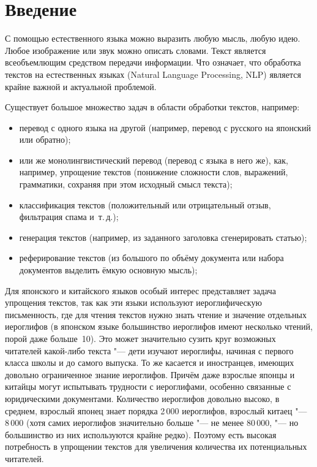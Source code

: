 \chapter*{Введение} %

С помощью естественного языка можно выразить любую мысль, любую идею.
Любое изображение или звук можно описать словами.
Текст является всеобъемлющим средством передачи информации.
Что означает, что обработка текстов на естественных языках (Natural Language Processing, NLP) является крайне важной и актуальной проблемой.

Существует большое множество задач в области обработки текстов, например:
\begin{itemize}%
  \item перевод с одного языка на другой (например, перевод с русского на японский или обратно);
  \item или же монолингвистический перевод (перевод с языка в него же),  как, например, упрощение текстов (понижение сложности слов, выражений, грамматики, сохраняя при этом исходный смысл текста);
  \item классификация текстов (положительный или отрицательный отзыв, фильтрация спама и~т.\,д.);
  \item генерация текстов (например, из заданного заголовка сгенерировать статью);
  \item реферирование текстов (из большого по объёму документа или набора документов выделить ёмкую основную мысль);
\end{itemize}

Для японского и китайского языков особый интерес представляет задача упрощения текстов, так как эти языки используют иероглифическую письменность, где для чтения текстов нужно знать чтение и значение отдельных иероглифов (в японском языке большинство иероглифов имеют несколько чтений, порой даже больше~10).
Это может значительно сузить круг возможных читателей какой-либо текста "--- дети изучают иероглифы, начиная с первого класса школы и до самого выпуска.
То же касается и иностранцев, имеющих довольно ограниченное знание иероглифов.
Причём даже взрослые японцы и китайцы могут испытывать трудности с иероглифами, особенно связанные с юридическими документами.
Количество иероглифов довольно высоко, в среднем, взрослый японец знает порядка 2\,000 иероглифов, взрослый китаец "--- 8\,000 (хотя самих иероглифов значительно больше "--- не менее 80\,000, "--- но большинство из них используются крайне редко).
Поэтому есть высокая потребность в упрощении текстов для увеличения количества их потенциальных читателей.

